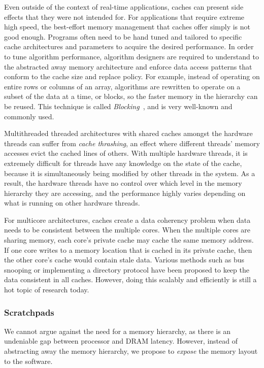 Even outside of the context of real-time applications, caches can present side effects that they were not intended for.  
For applications that require extreme high speed, the best-effort memory management that caches offer simply is not good enough.
Programs often need to be hand tuned and tailored to specific cache architectures and parameters to acquire the desired performance. 
In order to tune algorithm performance, algorithm designers are required to understand to the abstracted away memory architecture and enforce data access patterns that conform to the cache size and replace policy.   
For example, instead of operating on entire rows or columns of an array, algorithms are rewritten to operate on a subset of the data at a time, or blocks, so the faster memory in the hierarchy can be reused.
This technique is called \emph{Blocking}~\cite{Lam91thecache}, and is very well-known and commonly used.   

Multithreaded threaded architectures with shared caches amongst the hardware threads can suffer from \emph{cache thrashing}, an effect where different threads' memory accesses evict the cached lines of others.
With multiple hardware threads, it is extremely difficult for threads have any knowledge on the state of the cache, because it is simultaneously being modified by other threads in the system. 
As a result, the hardware threads have no control over which level in the memory hierarchy they are accessing, and the performance highly varies depending on what is running on other hardware threads. 

For multicore architectures, caches create a data coherency problem when data needs to be consistent between the multiple cores.
When the multiple cores are sharing memory, each core's private cache may cache the same memory address. 
If one core writes to a memory location that is cached in its private cache, then the other core's cache would contain stale data. 
Various methods such as bus snooping or implementing a directory protocol have been proposed to keep the data consistent in all caches. 
However, doing this scalably and efficiently is still a hot topic of research today.

\subsubsection{Scratchpads}
We cannot argue against the need for a memory hierarchy, as there is an undeniable gap between processor and DRAM latency.
However, instead of abstracting away the memory hierarchy, we propose to \emph{expose} the memory layout to the software.  

